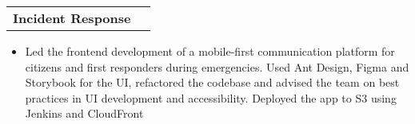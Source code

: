 \documentclass[letterpaper]{article}
\makeatletter
\newcommand{\resumeItemWithoutTitle}[1]{
  \item\small{
    {#1 \vspace{0pt}}
  }
}
\newcommand{\shortSection}[1]{
    \vspace{-6pt}
    \section{#1}
}
\newcommand{\projectHeading}[1]{
  \begin{tabular*}{\textwidth}{l@{\extracolsep{\fill}}r}
        \textbf{#1}
    \end{tabular*}\vspace{0pt}
}
\newcommand*{\skill}[2]{
  \textbf{#1 : }#2 \\
  \vspace{1pt}
}
\newcommand{\resumeItemListStart}{\begin{itemize}}
\newcommand{\resumeItemListEnd}{\end{itemize}}
\makeatother
\begin{document}
\vspace{3pt}
\projectHeading {Incident Response}
\resumeItemListStart
\resumeItemWithoutTitle{Led the frontend development of a mobile-first communication platform for citizens and first responders during emergencies. Used Ant Design, Figma and Storybook for the UI, refactored the codebase and advised the team on best practices in UI development and accessibility. Deployed the app to S3 using Jenkins and CloudFront}
\resumeItemListEnd


\end{document}
